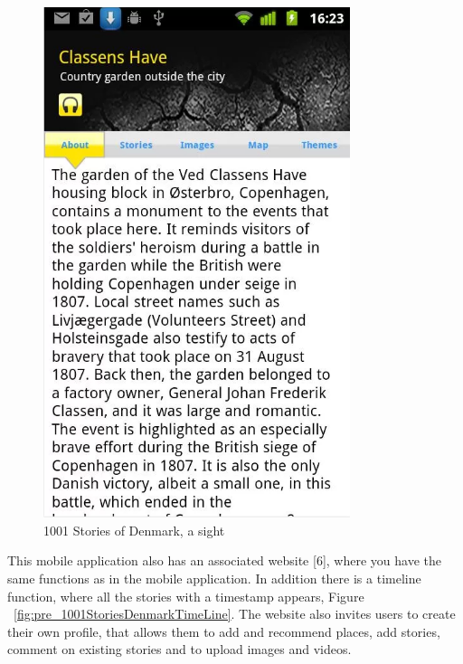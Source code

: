 \documentclass[11pt]{book}
\begin{document}
\begin{figure}[H]
      \centering
      \includegraphics[width=0.8\textwidth]{Figures/Prestudy/1001storiesStory.png}
      \caption{1001 Stories of Denmark, a sight}
      \label{fig:pre_1001StoriesDenmarkAppStory}
\end{figure}

This mobile application also has an associated website [6], where you have the same functions as in the mobile application. In addition there is a timeline function, where all the stories with a timestamp appears, Figure ~\ref{fig:pre_1001StoriesDenmarkTimeLine}. The website also invites users to create their own profile, that allows them to add and recommend places, add stories, comment on existing stories and to  upload images and videos.
\end{document}
